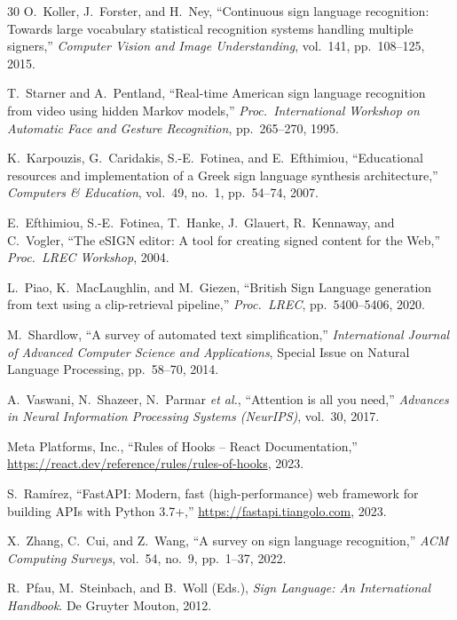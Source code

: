 \documentclass[12pt,a4paper,oneside]{report}
\begin{document}
\begin{thebibliography}{30}
O.\ Koller, J.\ Forster, and H.\ Ney,
``Continuous sign language recognition: Towards large vocabulary statistical recognition systems handling multiple signers,''
\textit{Computer Vision and Image Understanding}, vol.\ 141, pp.\ 108--125, 2015.

T.\ Starner and A.\ Pentland,
``Real-time American sign language recognition from video using hidden Markov models,''
\textit{Proc.\ International Workshop on Automatic Face and Gesture Recognition}, pp.\ 265--270, 1995.

K.\ Karpouzis, G.\ Caridakis, S.-E.\ Fotinea, and E.\ Efthimiou,
``Educational resources and implementation of a Greek sign language synthesis architecture,''
\textit{Computers \& Education}, vol.\ 49, no.\ 1, pp.\ 54--74, 2007.

E.\ Efthimiou, S.-E.\ Fotinea, T.\ Hanke, J.\ Glauert, R.\ Kennaway, and C.\ Vogler,
``The eSIGN editor: A tool for creating signed content for the Web,''
\textit{Proc.\ LREC Workshop}, 2004.

L.\ Piao, K.\ MacLaughlin, and M.\ Giezen,
``British Sign Language generation from text using a clip-retrieval pipeline,''
\textit{Proc.\ LREC}, pp.\ 5400--5406, 2020.

M.\ Shardlow,
``A survey of automated text simplification,''
\textit{International Journal of Advanced Computer Science and Applications}, Special Issue on Natural Language Processing, pp.\ 58--70, 2014.

A.\ Vaswani, N.\ Shazeer, N.\ Parmar \textit{et al.},
``Attention is all you need,''
\textit{Advances in Neural Information Processing Systems (NeurIPS)}, vol.\ 30, 2017.

Meta Platforms, Inc.,
``Rules of Hooks -- React Documentation,''
\url{https://react.dev/reference/rules/rules-of-hooks}, 2023.

S.\ Ram\'irez,
``FastAPI: Modern, fast (high-performance) web framework for building APIs with Python 3.7+,''
\url{https://fastapi.tiangolo.com}, 2023.

X.\ Zhang, C.\ Cui, and Z.\ Wang,
``A survey on sign language recognition,''
\textit{ACM Computing Surveys}, vol.\ 54, no.\ 9, pp.\ 1--37, 2022.

R.\ Pfau, M.\ Steinbach, and B.\ Woll (Eds.),
\textit{Sign Language: An International Handbook}.
De Gruyter Mouton, 2012.

\end{thebibliography}
\end{document}
